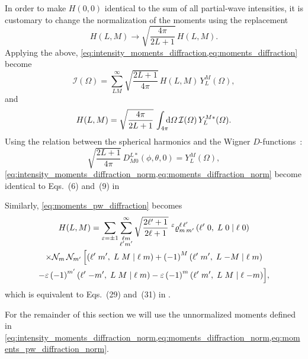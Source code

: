 In order to make $H(0, 0)$ identical to the sum of all partial-wave
intensities, it is customary to change the normalization of the
moments using the replacement
\begin{equation}
  H(L, M)
  \to \sqrt{\frac{4 \pi}{2 L + 1}}\, H(L, M).
\end{equation}
Applying the above,
\cref{eq:intensity_moments_diffraction,eq:moments_diffraction} become
\begin{equation}
  \label{eq:intensity_moments_diffraction_norm}
  \mathcal{I}(\Omega)
  = \sum_{L M}^\infty \sqrt{\frac{2 L + 1}{4 \pi}}\, H(L, M)\, Y_L^M(\Omega),
\end{equation}
and
\begin{equation}
  \label{eq:moments_diffraction_norm}
  H(L, M)
  = \sqrt{\frac{4 \pi}{2 L + 1}}\, \int_{4 \pi}\!\!\! \dif{\Omega}\, \mathcal{I}(\Omega)\, Y_L^{M *}(\Omega).
\end{equation}
Using the relation between the spherical harmonics and the Wigner
$D$-functions~\cite{wikipedia:wignerD}:
\begin{equation}
  \sqrt{\frac{2 L + 1}{4 \pi}}\, D^{L *}_{M 0}(\phi, \theta, 0)
  = Y_L^M(\Omega),
\end{equation}
\cref{eq:intensity_moments_diffraction_norm,eq:moments_diffraction_norm}
become identical to Eqs.~(6) and~(9) in 

Similarly, \cref{eq:moments_pw_diffraction} becomes
\begin{multline}
  \label{eq:moments_pw_diffraction_norm}
  H(L, M)
  = \sum_{\varepsilon = \pm 1} \sum_{\substack{\ell m \\ \ell' m'}}^\infty
    \sqrt{\frac{2 \ell' + 1}{2 \ell + 1}}\,
    \prescript{\ensuremath{\varepsilon}}{}{\varrho}^{\ell\, \ell'}_{m\, m'}\, ({\ell'}\;{0},\;{L}\;{0}\; |\; {\ell}\;{0}) \\
    \times \mathcal{N}_m\, \mathcal{N}_{m'}\, \Big[
      ({\ell'}\;{m'},\;{L}\;{M}\; |\; {\ell}\;{m})
      + {(-1)}^M\, ({\ell'}\;{m'},\;{L}\;{-M}\; |\; {\ell}\;{m}) \\
      - \varepsilon\, {(-1)}^{m'}\, ({\ell'}\;{-m'},\;{L}\;{M}\; |\; {\ell}\;{m})
      - \varepsilon\, {(-1)}^m\, ({\ell'}\;{m'},\;{L}\;{M}\; |\; {\ell}\;{-m}) \Big],
\end{multline}
which is equivalent to Eqs.~(29) and~(31) in .

For the remainder of this section we will use the unnormalized moments
defined in
\cref{eq:intensity_moments_diffraction_norm,eq:moments_diffraction_norm,eq:moments_pw_diffraction_norm}.



